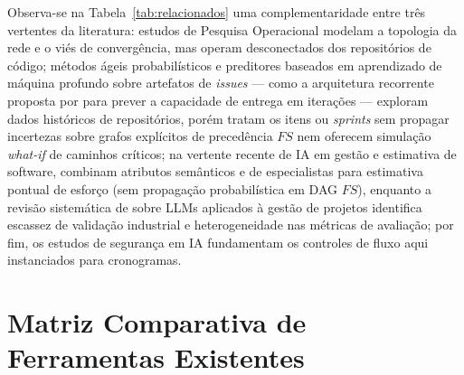 \documentclass[12pt,openany,oneside,a4paper,english,brazilian,sumario=tradicional]{abntex2}
\begin{document}
Observa-se na Tabela~\ref{tab:relacionados} uma complementaridade entre três vertentes da literatura: estudos de Pesquisa Operacional \cite{clark1961,vanslyke1963,williams1992,hulett2000} modelam a topologia da rede e o viés de convergência, mas operam desconectados dos repositórios de código; métodos ágeis probabilísticos \cite{magennis2011,vacanti2015} e preditores baseados em aprendizado de máquina profundo sobre artefatos de \textit{issues} --- como a arquitetura recorrente proposta por  para prever a capacidade de entrega em iterações --- exploram dados históricos de repositórios, porém tratam os itens ou \textit{sprints} sem propagar incertezas sobre grafos explícitos de precedência $FS$ nem oferecem simulação \textit{what-if} de caminhos críticos; na vertente recente de IA em gestão e estimativa de software,  combinam atributos semânticos e de especialistas para estimativa pontual de esforço (sem propagação probabilística em DAG $FS$), enquanto a revisão sistemática de  sobre LLMs aplicados à gestão de projetos identifica escassez de validação industrial e heterogeneidade nas métricas de avaliação; por fim, os estudos de segurança em IA \cite{greshake2023,debenedetti2024,debenedetti2025camel,beurerkellner2025patterns} fundamentam os controles de fluxo aqui instanciados para cronogramas.

\section{Matriz Comparativa de Ferramentas Existentes}\label{sec:ferramentas}
\end{document}
